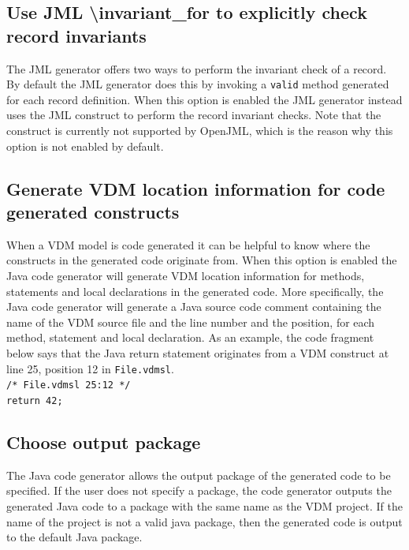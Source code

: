 \subsection{Use JML \textbackslash invariant\_for to explicitly check record invariants}
\label{sec:inv-for}

The JML generator offers two ways to perform the invariant check of a
record. By default the JML generator does this by invoking a
\texttt{valid} method generated for each record definition. When this
option is enabled the JML generator instead uses the JML
 construct to perform the record invariant
checks. Note that the  construct is currently
not supported by OpenJML, which is the reason why this option is not
enabled by default.

\subsection{Generate VDM location information for code generated constructs}
\label{sec:vdm-loc}

When a VDM model is code generated it can be helpful to know where the
constructs in the generated code originate from. When this option is
enabled the Java code generator will generate VDM location information
for methods, statements and local declarations in the generated
code. More specifically, the Java code generator will generate a Java
source code comment containing the name of the VDM source file and the
line number and the position, for each method, statement and local
declaration. As an example, the code fragment below says that the Java
return statement originates from a VDM construct at line 25,
position 12 in \texttt{File.vdmsl}.\\

\noindent \texttt{/* File.vdmsl 25:12 */\\return 42;}

\subsection{Choose output package}
\label{sec:javapackage}

The Java code generator allows the output package of the generated
code to be specified. If the user does not specify a package, the code
generator outputs the generated Java code to a package with the same
name as the VDM project. If the name of the project is not a valid
java package, then the generated code is output to the default Java
package.

